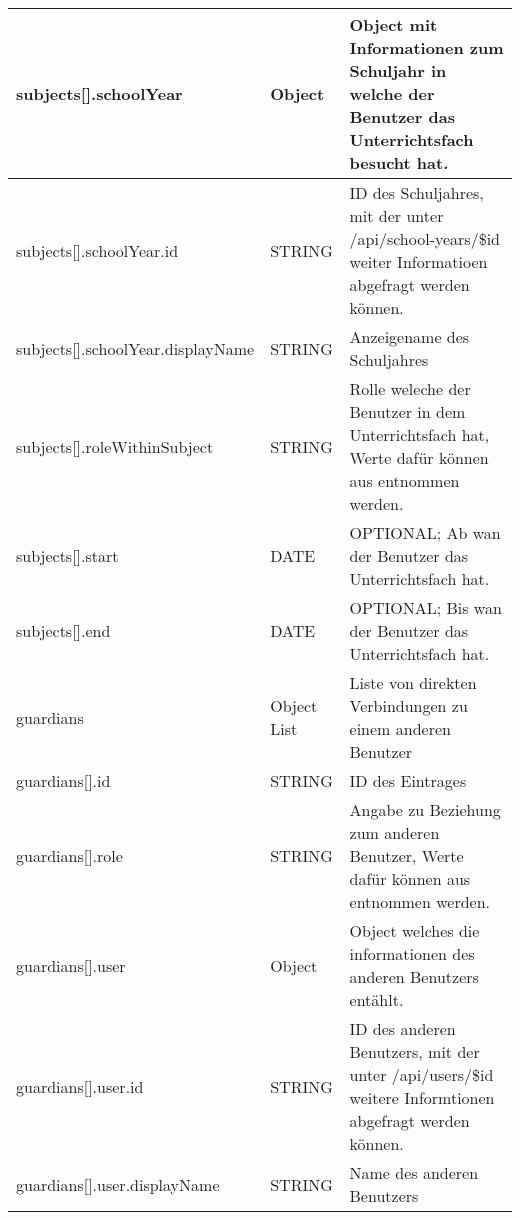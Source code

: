 \begin{longtable}{|p{}|p{}|p{}|}
subjects[].schoolYear & Object & Object mit Informationen zum Schuljahr in welche der Benutzer das Unterrichtsfach besucht hat. \\ \hline
subjects[].schoolYear.id & STRING & ID des Schuljahres, mit der unter /api/school-years/\$id weiter Informatioen abgefragt werden können. \\ \hline
subjects[].schoolYear.displayName & STRING & Anzeigename des Schuljahres \\\hline
subjects[].roleWithinSubject & STRING & Rolle weleche der Benutzer in dem Unterrichtsfach hat, Werte dafür können aus {tab:intro:rolessubject} entnommen werden. \\ \hline
subjects[].start & DATE & OPTIONAL; Ab wan der Benutzer das Unterrichtsfach hat.\\ \hline
subjects[].end & DATE & OPTIONAL; Bis wan der Benutzer das Unterrichtsfach hat. \\ \hline
guardians & Object List & Liste von direkten Verbindungen zu einem anderen Benutzer \\ \hline
guardians[].id & STRING & ID des Eintrages \\ \hline
guardians[].role & STRING & Angabe zu Beziehung zum anderen Benutzer, Werte dafür können aus {tab:intro:rolesuser} entnommen werden. \\ \hline
guardians[].user & Object & Object welches die informationen des anderen Benutzers entählt. \\ \hline
guardians[].user.id & STRING & ID des anderen Benutzers, mit der unter /api/users/\$id weitere Informtionen abgefragt werden können. \\ \hline
guardians[].user.displayName & STRING & Name des anderen Benutzers \\ \hline
\end{longtable}
